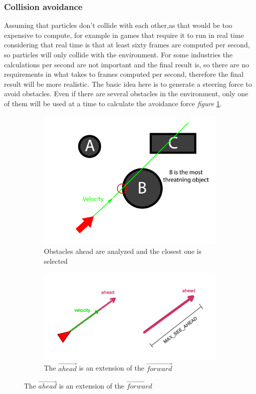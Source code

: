 \subsubsection{Collision avoidance}
Assuming that particles don't collide with each other,as that would be too expensive to compute, for example in games that require it to run in real time considering that real time is that at least sixty frames are computed per second, so particles will only collide with the environment. For some industries the calculations per second are not important and the final result is, so there are no requirements in what takes to frames computed per second, therefore the final result will be more realistic. The basic idea here is to generate a steering force to avoid obstacles. Even if there are several obstacles in the environment, only one of them will be used at a time to calculate the avoidance force \emph{figure} \ref{fig:four}.
\begin{figure}
	\begin{subfigure}[b]{0.4\textwidth}
		\includegraphics[width=\textwidth]{CollisionAvoidanceBasis}
		\caption{Obstacles ahead are analyzed and the closest one is selected}
		\label{fig:four}
	\end{subfigure}
	\begin{subfigure}[b]{0.4\textwidth}
		\includegraphics[width=\textwidth]{vectorahead}
		\caption{The $\vec{ahead}$ is an extension of the $\vec{forward}$}
		\label{fig:five}
	\end{subfigure}
\end{figure}
